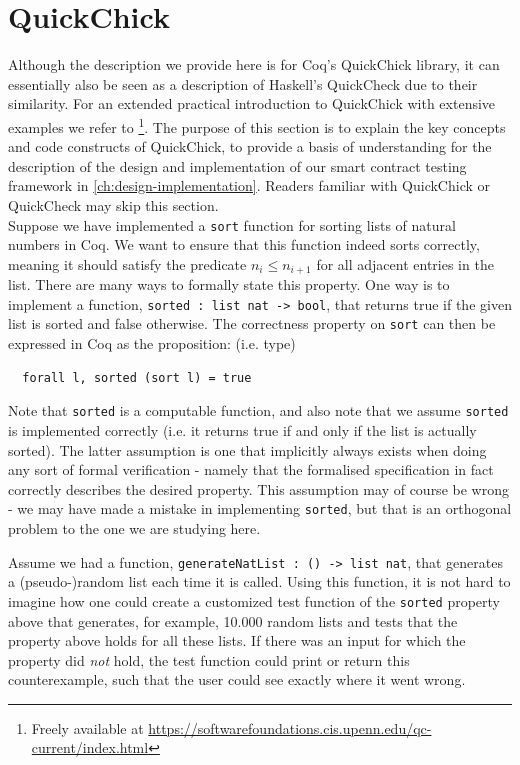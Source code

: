 \documentclass[twoside,11pt,openright]{report}
\newenvironment{code}{\captionsetup{type=figure, singlelinecheck=off, justification=raggedleft}}{}
\newcommand{\coq}[1]{\texttt{#1}}
\begin{document}
\section{QuickChick}
\label{sec:obt-qc}
Although the description we provide here is for Coq's QuickChick library, it can essentially also be seen as a description of Haskell's QuickCheck due to their similarity. For an extended practical introduction to QuickChick with extensive examples we refer to \cite{Pierce:SF4}\footnote{Freely available at \url{https://softwarefoundations.cis.upenn.edu/qc-current/index.html}}. The purpose of this section is to explain the key concepts and code constructs of QuickChick, to provide a basis of understanding for the description of the design and implementation of our smart contract testing framework in \autoref{ch:design-implementation}. Readers familiar with QuickChick or QuickCheck may skip this section.
\medskip\\
Suppose we have implemented a \coq{sort} function for sorting lists of natural numbers in Coq. We want to ensure that this function indeed sorts correctly, meaning it should satisfy the predicate $n_i \le n_{i+1}$ for all adjacent entries in the list. There are many ways to formally state this property. One way is to implement a function, \coq{sorted : list nat -> bool}, that returns true if the given list is sorted and false otherwise. The correctness property on \coq{sort} can then be expressed in Coq as the proposition: (i.e. type)
\begin{code}
\begin{verbatim}
  forall l, sorted (sort l) = true
\end{verbatim}
\end{code}
Note that \coq{sorted} is a computable function, and also note that we assume \coq{sorted} is implemented correctly (i.e. it returns true if and only if the list is actually sorted). The latter assumption is one that implicitly always exists when doing any sort of formal verification - namely that the formalised specification in fact correctly describes the desired property. This assumption may of course be wrong - we may have made a mistake in implementing \coq{sorted}, but that is an orthogonal problem to the one we are studying here.

Assume we had a function, \coq{generateNatList : () -> list nat}, that generates a (pseudo-)random list each time it is called. Using this function, it is not hard to imagine how one could create a customized test function of the \coq{sorted} property above that generates, for example, 10.000 random lists and tests that the property above holds for all these lists. If there was an input for which the property did \textit{not} hold, the test function could print or return this counterexample, such that the user could see exactly where it went wrong.
\end{document}
